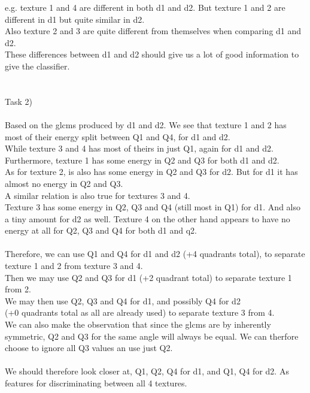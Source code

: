 \documentclass[12pt, letterpaper, twoside]{article}
\begin{document}
e.g. texture 1 and 4 are different in both d1 and d2. But texture 1 and 2 are different in d1 but quite similar in d2.\\
Also texture 2 and 3 are quite different from themselves when comparing d1 and d2.\\
These differences between d1 and d2 should give us a lot of good information to give the classifier.\\
\ \\
\ \\
Task 2)\\
\ \\
Based on the glcms produced by d1 and d2. We see that texture 1 and 2 has most of their energy split between Q1 and Q4, for d1 and d2.\\
While texture 3 and 4 has most of theirs in just Q1, again for d1 and d2.\\
Furthermore, texture 1 has some energy in Q2 and Q3 for both d1 and d2.\\
As for texture 2, is also has some energy in Q2 and Q3 for d2. But for d1 it has almost no energy in Q2 and Q3.\\
A similar relation is also true for textures 3 and 4.\\
Texture 3 has some energy in Q2, Q3 and Q4 (still most in Q1) for d1. And also a tiny amount for d2 as well. Texture 4 on the other hand appears to have no energy at all for Q2, Q3 and Q4 for both d1 and q2.\\
\ \\
Therefore, we can use Q1 and Q4 for d1 and d2 (+4 quadrants total), to separate texture 1 and 2 from texture 3 and 4.\\
Then we may use Q2 and Q3 for d1 (+2 quadrant total) to separate texture 1 from 2.\\
We may then use Q2, Q3 and Q4 for d1, and possibly Q4 for d2\\
(+0 quadrants total as all are already used) to separate texture 3 from 4.\\
We can also make the observation that since the glcms are by inherently symmetric, Q2 and Q3 for the same angle will always be equal. We can therfore choose to ignore all Q3 values an use just Q2.\\     
\ \\
We should therefore look closer at, Q1, Q2, Q4 for d1, and Q1, Q4 for d2. As features for discriminating between all 4 textures.\\
\ \\
\ \\
\end{document}
